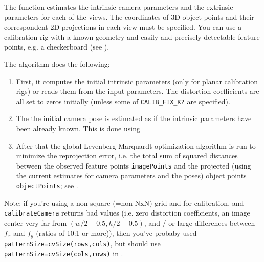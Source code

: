 \begin{description}
{\begin{description}
\end{description}}
\end{description}

The function estimates the intrinsic camera
parameters and the extrinsic parameters for each of the views. The
coordinates of 3D object points and their correspondent 2D projections
in each view must be specified. You can use a calibration rig with a known geometry and easily and precisely detectable feature points, e.g. a checkerboard (see ).

The algorithm does the following:
\begin{enumerate}
    \item First, it computes the initial intrinsic parameters (only for planar calibration rigs) or reads them from the input parameters. The distortion coefficients are all set to zeros initially (unless some of \texttt{CALIB\_FIX\_K?} are specified).
    \item The the initial camera pose is estimated as if the intrinsic parameters have been already known. This is done using 
    \item After that the global Levenberg-Marquardt optimization algorithm is run to minimize the reprojection error, i.e. the total sum of squared distances between the observed feature points \texttt{imagePoints} and the projected (using the current estimates for camera parameters and the poses) object points \texttt{objectPoints}; see .
\end{enumerate}

Note: if you're using a non-square (=non-NxN) grid and
 for calibration, and \texttt{calibrateCamera} returns
bad values (i.e. zero distortion coefficients, an image center very far from
$(w/2-0.5,h/2-0.5)$, and / or large differences between $f_x$ and $f_y$ (ratios of
10:1 or more)), then you've probaby used \texttt{patternSize=cvSize(rows,cols)},
but should use \texttt{patternSize=cvSize(cols,rows)} in .

